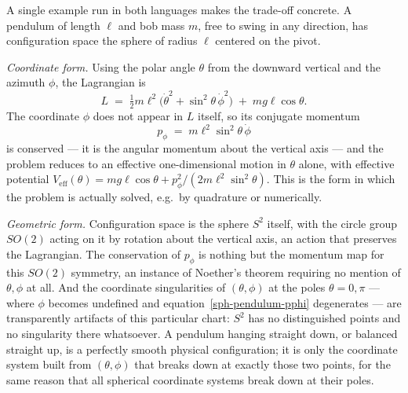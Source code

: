 A single example run in both languages makes the trade-off concrete.
A pendulum of length $\ell$ and bob mass $m$, free to swing in any
direction, has configuration space the sphere of radius $\ell$
centered on the pivot.

\emph{Coordinate form.} Using the polar angle $\theta$ from the
downward vertical and the azimuth $\phi$, the Lagrangian is
\begin{equation}
  L \;=\; \tfrac12 m\ell^2\bigl(\dot\theta^2 + \sin^2\theta\,
  \dot\phi^2\bigr) \;+\; mg\ell\cos\theta .
  \label{sph-pendulum-L}
\end{equation}
The coordinate $\phi$ does not appear in $L$ itself, so its conjugate
momentum
\begin{equation}
  p_\phi \;=\; m\ell^2\sin^2\theta\,\dot\phi
  \label{sph-pendulum-pphi}
\end{equation}
is conserved --- it is the angular momentum about the vertical axis
--- and the problem reduces to an effective one-dimensional motion in
$\theta$ alone, with effective potential $V_{\mathrm{eff}}(\theta) =
mg\ell\cos\theta + p_\phi^2/(2m\ell^2\sin^2\theta)$. This is the form
in which the problem is actually solved, e.g.\ by quadrature or
numerically.

\emph{Geometric form.} Configuration space is the sphere $S^2$
itself, with the circle group $SO(2)$ acting on it by rotation about
the vertical axis, an action that preserves the Lagrangian. The
conservation of $p_\phi$ is nothing but the momentum map for this
$SO(2)$ symmetry, an instance of Noether's theorem requiring no
mention of $\theta,\phi$ at all. And the coordinate singularities of
$(\theta,\phi)$ at the poles $\theta=0,\pi$ --- where $\phi$ becomes
undefined and equation~\eqref{sph-pendulum-pphi} degenerates ---
are transparently artifacts of this particular chart: $S^2$ has no
distinguished points and no singularity there whatsoever. A pendulum
hanging straight down, or balanced straight up, is a perfectly smooth
physical configuration; it is only the coordinate system built from
$(\theta,\phi)$ that breaks down at exactly those two points, for the
same reason that all spherical coordinate systems break down at their
poles.

